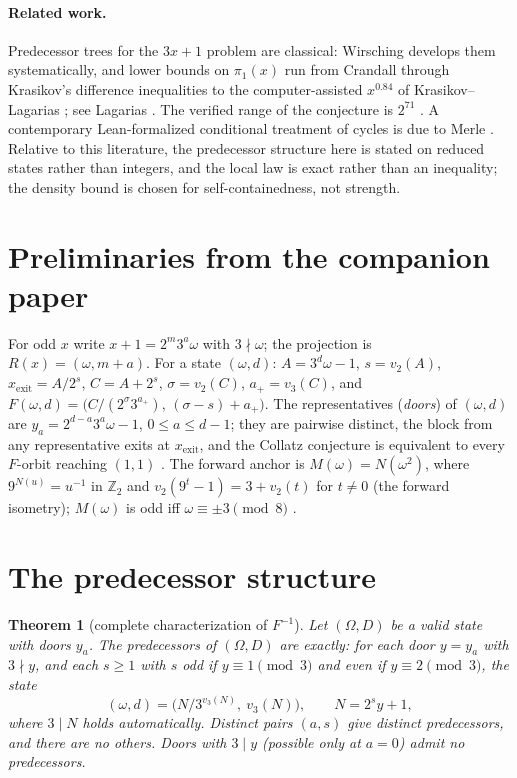 \documentclass[11pt]{article}
\newtheorem{theorem}{Theorem}[section]
\theoremstyle{remark}
\newcommand{\Z}{\mathbb{Z}}
\newcommand{\vt}[1]{v_2\!\left(#1\right)}
\newcommand{\vth}[1]{v_3\!\left(#1\right)}
\newcommand{\w}{\omega}
\begin{document}
\paragraph{Related work.} Predecessor trees for the $3x+1$ problem are classical: Wirsching \cite{wirsching} develops them systematically, and lower bounds on $\pi_1(x)$ run from Crandall \cite{crandall} through Krasikov's difference inequalities to the computer-assisted $x^{0.84}$ of Krasikov--Lagarias \cite{kl}; see Lagarias \cite{lagarias}. The verified range of the conjecture is $2^{71}$ \cite{barina}. A contemporary Lean-formalized conditional treatment of cycles is due to Merle \cite{merle}. Relative to this literature, the predecessor structure here is stated on reduced states rather than integers, and the local law is exact rather than an inequality; the density bound is chosen for self-containedness, not strength.

\section{Preliminaries from the companion paper}\label{sec:prelim}

For odd $x$ write $x + 1 = 2^m 3^a \w$ with $3\nmid\w$; the projection is $R(x) = (\w, m+a)$. For a state $(\w,d)$: $A = 3^d\w - 1$, $s = \vt{A}$, $x_{\mathrm{exit}} = A/2^s$, $C = A + 2^s$, $\sigma = \vt C$, $a_+ = \vth C$, and $F(\w,d) = \bigl(C/(2^\sigma 3^{a_+}),\, (\sigma - s) + a_+\bigr)$. The representatives (\emph{doors}) of $(\w,d)$ are $y_a = 2^{d-a}3^a\w - 1$, $0 \le a \le d-1$; they are pairwise distinct, the block from any representative exits at $x_{\mathrm{exit}}$, and the Collatz conjecture is equivalent to every $F$-orbit reaching $(1,1)$ \cite[Thm.~2.3]{paper1}. The forward anchor is $M(\w) = N(\w^2)$, where $9^{N(u)} = u^{-1}$ in $\Z_2$ and $\vt{9^t - 1} = 3 + \vt t$ for $t \neq 0$ (the forward isometry); $M(\w)$ is odd iff $\w \equiv \pm3 \pmod 8$ \cite[\S3]{paper1}.

\section{The predecessor structure}\label{sec:pred}

\begin{theorem}[complete characterization of $F^{-1}$]\label{thm:pred}
Let $(\Omega, D)$ be a valid state with doors $y_a$. The predecessors of $(\Omega,D)$ are exactly: for each door $y = y_a$ with $3 \nmid y$, and each $s \ge 1$ with $s$ odd if $y \equiv 1 \pmod 3$ and even if $y \equiv 2 \pmod 3$, the state
\[ (\w, d) = \bigl( N/3^{\vth N},\ \vth N \bigr), \qquad N = 2^s y + 1, \]
where $3 \mid N$ holds automatically. Distinct pairs $(a,s)$ give distinct predecessors, and there are no others. Doors with $3 \mid y$ (possible only at $a = 0$) admit no predecessors.
\end{theorem}
\end{document}
